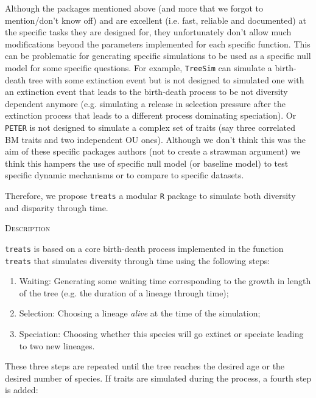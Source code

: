 \documentclass[12pt,letterpaper]{article}
\renewcommand{\section}[1]{%
\bigskip
\begin{center}
\begin{Large}
\normalfont\scshape #1
\medskip
\end{Large}
\end{center}}
\newcommand{\treats}{\texttt{treats} }
\begin{document}
Although the packages mentioned above (and more that we forgot to mention/don't know off) and are excellent (i.e. fast, reliable and documented) at the specific tasks they are designed for, they unfortunately don't allow much modifications beyond the parameters implemented for each specific function.
This can be problematic for generating specific simulations to be used as a specific null model for some specific questions.
For example, \texttt{TreeSim} can simulate a birth-death tree with some extinction event but is not designed to simulated one with an extinction event that leads to the birth-death process to be not diversity dependent anymore (e.g. simulating a release in selection pressure after the extinction process that leads to a different process dominating speciation).
Or \texttt{PETER} is not designed to simulate a complex set of traits (say three correlated BM traits and two independent OU ones).
Although we don't think this was the aim of these specific packages authors (not to create a strawman argument) we think this hampers the use of specific null model (or baseline model) to test specific dynamic mechanisms or to compare to specific datasets. 

Therefore, we propose \treats a modular \texttt{R} package to simulate both diversity and disparity through time.

\section{Description}
\treats is based on a core birth-death process implemented in the function \texttt{treats} that simulates diversity through time using the following steps:

\begin{enumerate}
    \item Waiting: Generating some waiting time corresponding to the growth in length of the tree (e.g. the duration of a lineage through time);
    \item Selection: Choosing a lineage \textit{alive} at the time of the simulation;
    \item Speciation: Choosing whether this species will go extinct or speciate leading to two new lineages.
\end{enumerate}

These three steps are repeated until the tree reaches the desired age or the desired number of species.
If traits are simulated during the process, a fourth step is added:
\end{document}
